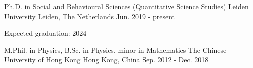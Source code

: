

\begin{cventries}

  \cventry
    {Ph.D. in Social and Behavioural Sciences (Quantitative Science Studies)}
    {Leiden University} %
    {Leiden, The Netherlands} %
    {Jun. 2019 - present} %
    {
      \begin{cvitems} %
        \item {Expected graduation: 2024}
      \end{cvitems}
    }

  \cventry
    {M.Phil. in Physics, B.Sc. in Physics, minor in Mathematics} %
    {The Chinese University of Hong Kong} %
    {Hong Kong, China} %
    {Sep. 2012 - Dec. 2018} %
    {}


\end{cventries}
